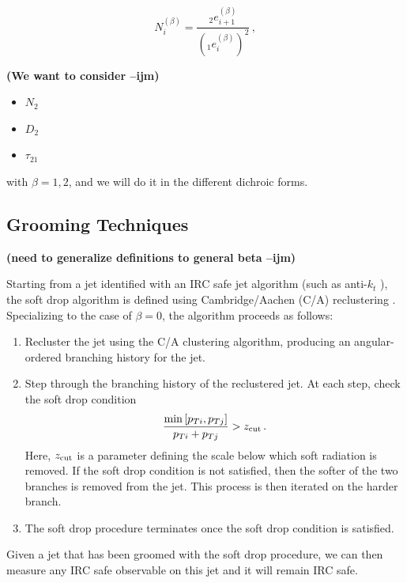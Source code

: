 \documentclass[11pt,letterpaper]{article}
\newcommand{\zcut}{z_{\rm cut}}
\newcommand{\ecfvar}[3]{{_{#1}e_{#2}^{(#3)}}}
\newcommand{\ijm}[1]{\textbf{\textcolor{llblue}{(#1 --ijm)}}}
\begin{document}
\begin{equation}
N_i^{(\beta)} = \frac{\ecfvar{2}{i+1}{\beta}}{(\ecfvar{1}{i}{\beta})^2}\,,
\end{equation}

\cite{Moult:2016cvt}


\ijm{We want to consider}

\begin{itemize}
\item $N_2$
\item $D_2$
\item $\tau_{21}$
\end{itemize}

with $\beta=1,2$, and we will do it in the different dichroic forms.

\subsection{Grooming Techniques}

\ijm{need to generalize definitions to general beta}

Starting from a jet identified with an IRC safe jet algorithm (such as anti-$k_t$ \cite{Cacciari:2008gp}), the soft drop algorithm is defined using Cambridge/Aachen (C/A) reclustering \cite{Dokshitzer:1997in,Wobisch:1998wt,Wobisch:2000dk}.  Specializing to the case of $\beta=0$, the algorithm proceeds as follows:
\begin{enumerate}

\item Recluster the jet using the C/A clustering algorithm, producing an angular-ordered branching history for the jet.

\item Step through the branching history of the reclustered jet.  At each step, check the soft drop condition
\begin{align}\label{eq:sd_cut}
\frac{\min\left[ p_{Ti}, p_{Tj}  \right]}{p_{Ti}+p_{Tj}}> \zcut \,.
\end{align}
Here, $\zcut$ is a parameter defining the scale below which soft radiation is removed.  If the soft drop condition is not satisfied, then the softer of the two branches is removed from the jet.  This process is then iterated on the harder branch.

\item The soft drop procedure terminates once the soft drop condition is satisfied.

\end{enumerate}
Given a jet that has been groomed with the soft drop procedure, we can then measure any IRC safe observable on this jet and it will remain IRC safe.  
\end{document}
